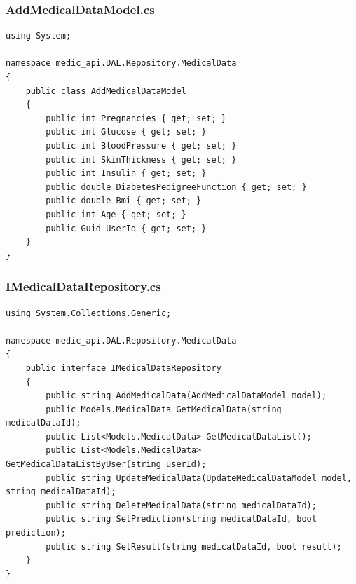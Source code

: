 \documentclass[12pt,a4paper]{article}
\begin{document}
	\subsubsection{AddMedicalDataModel.cs}
	\begin{lstlisting}
using System;

namespace medic_api.DAL.Repository.MedicalData
{
    public class AddMedicalDataModel
    {
        public int Pregnancies { get; set; }
        public int Glucose { get; set; }
        public int BloodPressure { get; set; }
        public int SkinThickness { get; set; }
        public int Insulin { get; set; }
        public double DiabetesPedigreeFunction { get; set; }
        public double Bmi { get; set; }
        public int Age { get; set; }
        public Guid UserId { get; set; }
    }
}
	\end{lstlisting}
		\subsubsection{IMedicalDataRepository.cs}
	\begin{lstlisting}
using System.Collections.Generic;

namespace medic_api.DAL.Repository.MedicalData
{
    public interface IMedicalDataRepository
    {
        public string AddMedicalData(AddMedicalDataModel model);
        public Models.MedicalData GetMedicalData(string medicalDataId);
        public List<Models.MedicalData> GetMedicalDataList();
        public List<Models.MedicalData> GetMedicalDataListByUser(string userId);
        public string UpdateMedicalData(UpdateMedicalDataModel model, string medicalDataId);
        public string DeleteMedicalData(string medicalDataId);
        public string SetPrediction(string medicalDataId, bool prediction);
        public string SetResult(string medicalDataId, bool result);
    }
}
	\end{lstlisting}
\end{document}
